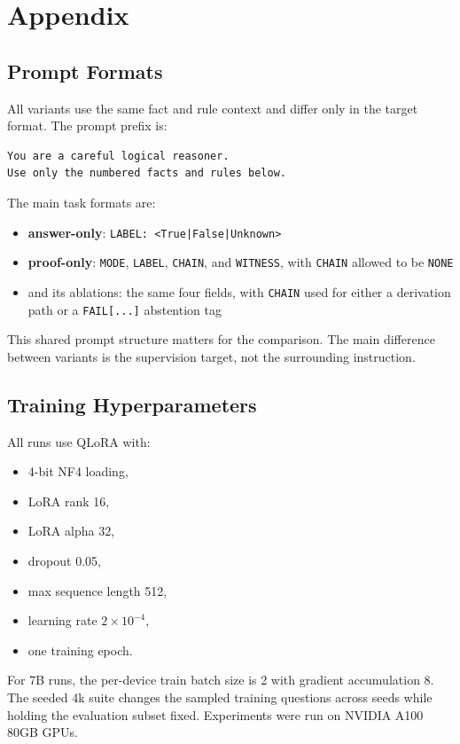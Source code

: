 \section{Appendix}

\subsection{Prompt Formats}

All variants use the same fact and rule context and differ only in the target format. The prompt prefix is:
\begin{verbatim}
You are a careful logical reasoner.
Use only the numbered facts and rules below.
\end{verbatim}

The main task formats are:
\begin{itemize}
\item \textbf{answer-only}: \texttt{LABEL: <True|False|Unknown>}
\item \textbf{proof-only}: \texttt{MODE}, \texttt{LABEL}, \texttt{CHAIN}, and \texttt{WITNESS}, with \texttt{CHAIN} allowed to be \texttt{NONE}
\item \model{} and its ablations: the same four fields, with \texttt{CHAIN} used for either a derivation path or a \texttt{FAIL[...]} abstention tag
\end{itemize}

This shared prompt structure matters for the comparison. The main difference between variants is the supervision target, not the surrounding instruction.

\subsection{Training Hyperparameters}

All runs use QLoRA with:
\begin{itemize}
\item 4-bit NF4 loading,
\item LoRA rank 16,
\item LoRA alpha 32,
\item dropout 0.05,
\item max sequence length 512,
\item learning rate \(2\times 10^{-4}\),
\item one training epoch.
\end{itemize}

For 7B runs, the per-device train batch size is 2 with gradient accumulation 8.
The seeded 4k suite changes the sampled training questions across seeds while
holding the evaluation subset fixed. Experiments were run on NVIDIA A100 80GB
GPUs.

